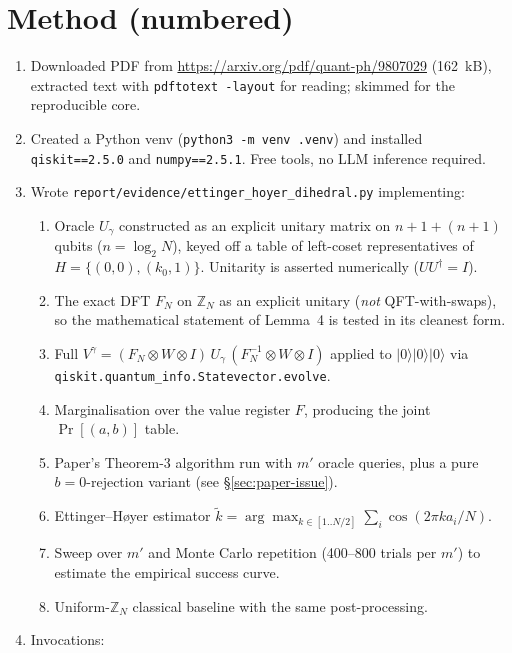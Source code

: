 \documentclass[11pt]{article}
\begin{document}
\section{Method (numbered)}
\begin{enumerate}
  \item Downloaded PDF from
        \url{https://arxiv.org/pdf/quant-ph/9807029} (162~kB), extracted text with
        \texttt{pdftotext -layout} for reading; skimmed for the reproducible core.
  \item Created a Python venv (\texttt{python3 -m venv .venv}) and installed
        \texttt{qiskit==2.5.0} and \texttt{numpy==2.5.1}. Free tools, no LLM inference required.
  \item Wrote \texttt{report/evidence/ettinger\_hoyer\_dihedral.py} implementing:
    \begin{enumerate}
      \item Oracle $U_\gamma$ constructed as an explicit unitary matrix
        on $n{+}1{+}(n{+}1)$ qubits ($n=\log_2 N$), keyed off a table of
        left-coset representatives of $H = \{(0,0),(k_0,1)\}$.
        Unitarity is asserted numerically ($UU^\dagger = I$).
      \item The exact DFT $F_N$ on $\mathbb{Z}_N$ as an explicit unitary
        (\emph{not} QFT-with-swaps), so the mathematical statement of Lemma~4
        is tested in its cleanest form.
      \item Full $V^\gamma = (F_N \otimes W \otimes I)\, U_\gamma\,
        (F_N^{-1} \otimes W \otimes I)$ applied to $|0\rangle|0\rangle|0\rangle$
        via \texttt{qiskit.quantum\_info.Statevector.evolve}.
      \item Marginalisation over the value register $F$, producing the joint
        $\Pr[(a,b)]$ table.
      \item Paper's Theorem-3 algorithm run with $m'$ oracle queries, plus a
        pure $b{=}0$-rejection variant (see \S\ref{sec:paper-issue}).
      \item Ettinger--H{\o}yer estimator
        $\tilde k = \arg\max_{k \in [1..N/2]} \sum_i \cos(2\pi k a_i / N)$.
      \item Sweep over $m'$ and Monte Carlo repetition
        (400--800 trials per $m'$) to estimate the empirical success curve.
      \item Uniform-$\mathbb{Z}_N$ classical baseline with the same
        post-processing.
    \end{enumerate}
  \item Invocations:
\begin{lstlisting}

\end{lstlisting}
\end{enumerate}
\end{document}
